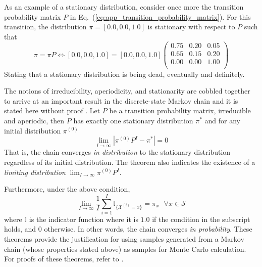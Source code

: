 As an example of a stationary distribution, consider once more the transition probability matrix $P$ in Eq.~(\ref{eq:app_transition_probability_matrix}).
For this transition, the distribution $\pi = [0.0, 0.0, 1.0]$ is stationary with respect to $P$ such that
\begin{equation}
	\pi = \pi P \Leftrightarrow [0.0, 0.0, 1.0] = [0.0, 0.0, 1.0] 		\begin{pmatrix}
		  0.75  & 0.20 & 0.05\\
      0.65  & 0.15 & 0.20\\
      0.00  & 0.00 & 1.00\\
		\end{pmatrix}
\label{eq:app_markov_chain_stationary_example}
\end{equation}
Stating that a stationary distribution is being dead, eventually and definitely.

The notions of irreducibility, aperiodicity, and stationarity are cobbled together to arrive at an important result in the discrete-state Markov chain and it is stated here without proof \cite{Sargent2017}.
Let $P$ be a transition probability matrix, irreducible and aperiodic, then $P$ has exactly one stationary distribution $\pi^*$ and for any initial distribution $\pi^{(0)}$
\begin{equation}
	\lim_{I \rightarrow \infty} |\pi^{(0)}P^I - \pi^*| = 0
\label{eq:app_markov_chain_convergence}
\end{equation}
That is, the chain converges \emph{in distribution} to the stationary distribution regardless of its initial distribution.
The theorem also indicates the existence of a \emph{limiting distribution} $\lim_{I \rightarrow \infty} \pi^{(0)}P^I$.

Furthermore, under the above condition,
\begin{equation}
	\lim_{I \rightarrow \infty} \frac{1}{I} \sum_{i=1}^{I} \mathbb{I}_{\{\mathcal{X}^{(i)} = x\}} = \pi_{x} \,\,\,\, \forall x \in \mathcal{S}
\label{eq:app_markov_chain_ergodic_theorem}
\end{equation}
where $\mathbb{I}$ is the indicator function where it is $1.0$ if the condition in the subscript holds, and $0$ otherwise.
In other words, the chain converges \emph{in probability}.
These theorems provide the justification for using samples generated from a Markov chain (whose properties stated above) as samples for Monte Carlo calculation.
For proofs of these theorems, refer to \cite{Robert2004}.

